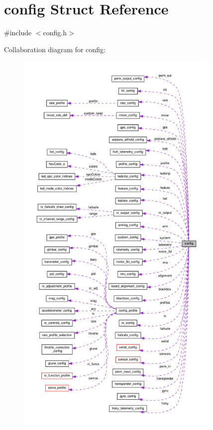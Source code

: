 \hypertarget{structconfig}{\section{config Struct Reference}
\label{structconfig}
}


{\ttfamily \#include $<$config.\+h$>$}



Collaboration diagram for config\+:\nopagebreak
\begin{figure}[H]
\begin{center}
\leavevmode
\includegraphics[height=550pt]{structconfig__coll__graph}
\end{center}
\end{figure}
